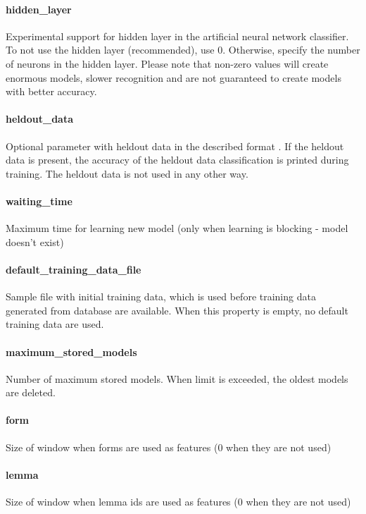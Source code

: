 \paragraph{hidden\_layer}
Experimental support for hidden layer in the artificial neural network classifier.
To not use the hidden layer (recommended), use 0. Otherwise, specify the number
of neurons in the hidden layer. Please note that non-zero values will create
enormous models, slower recognition and are not guaranteed to create models with
better accuracy.

\paragraph{heldout\_data}
Optional parameter with heldout data in the described format . If the heldout data
is present, the accuracy of the heldout data classification is printed during
training. The heldout data is not used in any other way.

\paragraph{waiting\_time}
Maximum time for learning new model (only when learning is blocking - model doesn't exist)


\paragraph{default\_training\_data\_file}
Sample file with initial training data, which is used before training data
generated from database are available. When this property is empty, no default training data
are used.

\paragraph{maximum\_stored\_models}
Number of maximum stored models. When limit is exceeded, the oldest models are deleted.

\paragraph{form}
Size of window when forms are used as features (0 when they are not used)

\paragraph{lemma}
Size of window when lemma ids are used as features (0 when they are not used)

